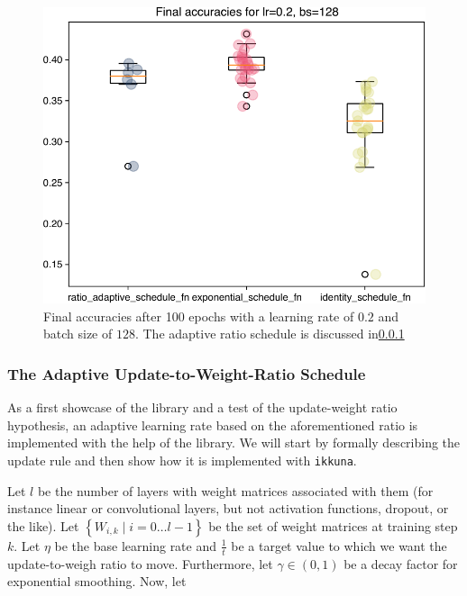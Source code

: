 \begin{figure}
    \centering
    \includegraphics[width=\linewidth]{gfx/diagrams/experiments/experiment_validation.pdf}
    \caption[Final accuracies after 100 epochs]{Final accuracies after 100
    epochs with a learning rate of $0.2$ and batch size of $128$. The adaptive
    ratio schedule is discussed in\cref{sec:ratio-schedule}}
    \label{fig:validation1}
\end{figure}

\subsubsection{The Adaptive Update-to-Weight-Ratio Schedule}\label{sec:ratio-schedule}%

As a first showcase of the library and a test of the update-weight ratio
hypothesis, an adaptive learning rate based on the aforementioned ratio is
implemented with the help of the library.  We will start by formally describing
the update rule and then show how it is implemented with \texttt{ikkuna}.

Let $l$ be the number of layers with weight matrices associated with them (for
instance linear or convolutional layers, but not activation functions, dropout,
or the like). Let $\left\{W_{i,k} \mid i = 0 \ldots l - 1\right\}$ be the set of weight
matrices at training step $k$.  Let $\eta$ be the base learning rate and
$\frac{1}{t}$ be a target value to which we want the update-to-weigh ratio to
move. Furthermore, let $\gamma \in (0, 1)$ be a decay factor for exponential
smoothing.  Now, let

